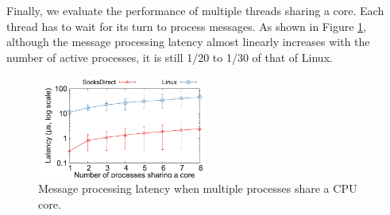 

Finally, we evaluate the performance of multiple threads sharing a core. Each thread has to wait for its turn to process messages.
As shown in Figure \ref {socksdirect:fig:eval-context-switch}, although the message processing latency almost linearly increases with the number of active processes, it is still 1/20 to 1/30 of that of Linux.


\begin{figure}[htbp]
	
	\centering \includegraphics[width=0.5\textwidth]{eval/microbenchmark/sharecore-lat.pdf}
	
	\caption{Message processing latency when multiple processes share a CPU core.}
	\label{socksdirect:fig:eval-context-switch}
\end{figure}



